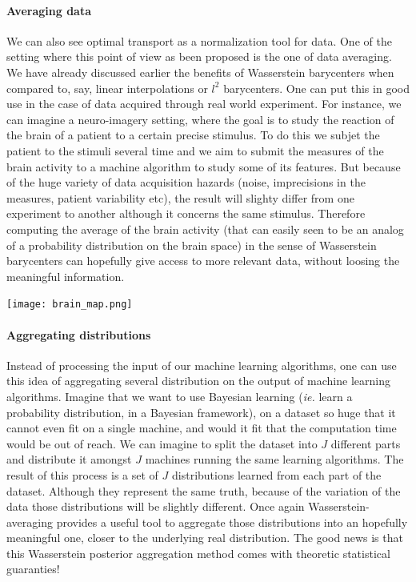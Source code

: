 \paragraph{Averaging data}

We can also see optimal transport as a normalization tool for data. One of
the setting where this point of view as been proposed is the one of data
averaging. We have already discussed earlier the benefits of Wasserstein
barycenters when compared to, say, linear interpolations or $l^2$
barycenters. One can put this in good use in the case of data acquired through
real world experiment. For instance, we can imagine a neuro-imagery setting,
where the goal is to study the reaction of the brain of a patient to a
certain precise stimulus. To do this we subjet the patient to the stimuli
several time and we aim to submit the measures of the brain activity to
a machine algorithm to study some of its features. But because of the huge
variety of data acquisition hazards (noise, imprecisions in the measures,
patient variability etc), the result will slighty differ from one experiment
to another although it concerns the same stimulus. Therefore computing the
average of the brain activity (that can easily seen to be an analog of a
probability distribution on the brain space) in the sense of Wasserstein
barycenters can hopefully give access to more relevant data, without loosing
the meaningful information.

\begin{center}
    \centering
	\texttt{[image: brain\_map.png]}
\end{center}

\paragraph{Aggregating distributions}

Instead of processing the input of our machine learning algorithms, one can
use this idea of aggregating several distribution on the output of machine
learning algorithms. Imagine that we want to use Bayesian learning (\emph{ie.}
learn a probability distribution, in a Bayesian framework), on a dataset so
huge that it cannot even fit on a single machine, and would it fit that the
computation time would be out of reach. We can imagine to split the dataset
into $J$ different parts and distribute it amongst $J$ machines running
the same learning algorithms. The result of this process is a set of $J$
distributions learned from each part of the dataset. Although they represent
the same truth, because of the variation of the data those distributions will
be slightly different. Once again Wasserstein-averaging provides a useful tool
to aggregate those distributions into an hopefully meaningful one, closer
to the underlying real distribution. The good news is that this Wasserstein
posterior aggregation method comes with theoretic statistical guaranties!


